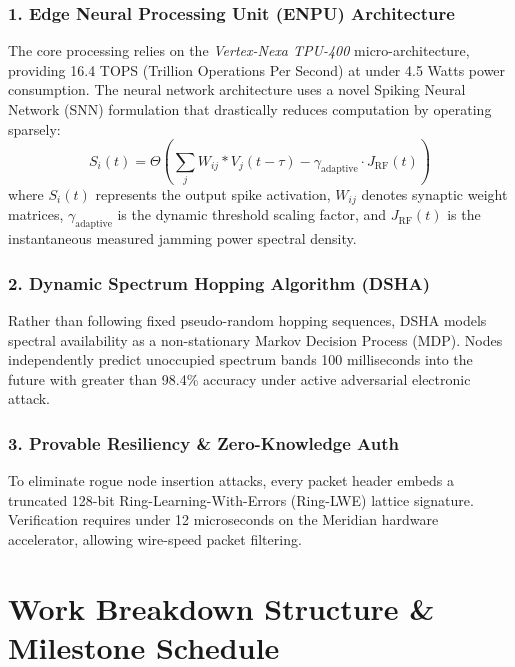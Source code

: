 \documentclass[10pt,a4paper]{article}
\begin{document}
\subsubsection{1. Edge Neural Processing Unit (ENPU) Architecture}
The core processing relies on the \emph{Vertex-Nexa TPU-400} micro-architecture, providing 16.4 TOPS (Trillion Operations Per Second) at under 4.5 Watts power consumption. The neural network architecture uses a novel Spiking Neural Network (SNN) formulation that drastically reduces computation by operating sparsely:
\begin{equation}
S_i(t) = \Theta \left( \sum_{j} W_{ij} * V_j(t - \tau) - \gamma_{\text{adaptive}} \cdot J_{\text{RF}}(t) \right)
\end{equation}
where $S_i(t)$ represents the output spike activation, $W_{ij}$ denotes synaptic weight matrices, $\gamma_{\text{adaptive}}$ is the dynamic threshold scaling factor, and $J_{\text{RF}}(t)$ is the instantaneous measured jamming power spectral density.

\subsubsection{2. Dynamic Spectrum Hopping Algorithm (DSHA)}
Rather than following fixed pseudo-random hopping sequences, DSHA models spectral availability as a non-stationary Markov Decision Process (MDP). Nodes independently predict unoccupied spectrum bands 100 milliseconds into the future with greater than 98.4\% accuracy under active adversarial electronic attack.

\subsubsection{3. Provable Resiliency \& Zero-Knowledge Auth}
To eliminate rogue node insertion attacks, every packet header embeds a truncated 128-bit Ring-Learning-With-Errors (Ring-LWE) lattice signature. Verification requires under 12 microseconds on the Meridian hardware accelerator, allowing wire-speed packet filtering.

\vspace{4pt}

\section{Work Breakdown Structure \& Milestone Schedule}
\end{document}
